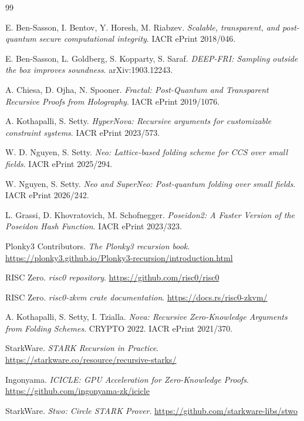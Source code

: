 \documentclass[11pt]{article}
\begin{document}
\begin{thebibliography}{99}

E. Ben-Sasson, I. Bentov, Y. Horesh, M. Riabzev.
\emph{Scalable, transparent, and post-quantum secure computational integrity}.
IACR ePrint 2018/046.

E. Ben-Sasson, L. Goldberg, S. Kopparty, S. Saraf.
\emph{DEEP-FRI: Sampling outside the box improves soundness}.
arXiv:1903.12243.

A. Chiesa, D. Ojha, N. Spooner.
\emph{Fractal: Post-Quantum and Transparent Recursive Proofs from Holography}.
IACR ePrint 2019/1076.

A. Kothapalli, S. Setty.
\emph{HyperNova: Recursive arguments for customizable constraint systems}.
IACR ePrint 2023/573.

W. D. Nguyen, S. Setty.
\emph{Neo: Lattice-based folding scheme for CCS over small fields}.
IACR ePrint 2025/294.

W. Nguyen, S. Setty.
\emph{Neo and SuperNeo: Post-quantum folding over small fields}.
IACR ePrint 2026/242.

L. Grassi, D. Khovratovich, M. Schofnegger.
\emph{Poseidon2: A Faster Version of the Poseidon Hash Function}.
IACR ePrint 2023/323.

Plonky3 Contributors.
\emph{The Plonky3 recursion book}.
\url{https://plonky3.github.io/Plonky3-recursion/introduction.html}

RISC Zero. \emph{risc0 repository}.
\url{https://github.com/risc0/risc0}

RISC Zero. \emph{risc0-zkvm crate documentation}.
\url{https://docs.rs/risc0-zkvm/}

A. Kothapalli, S. Setty, I. Tzialla.
\emph{Nova: Recursive Zero-Knowledge Arguments from Folding Schemes}.
CRYPTO 2022. IACR ePrint 2021/370.

StarkWare. \emph{STARK Recursion in Practice}.
\url{https://starkware.co/resource/recursive-starks/}

Ingonyama. \emph{ICICLE: GPU Acceleration for Zero-Knowledge Proofs}.
\url{https://github.com/ingonyama-zk/icicle}

StarkWare. \emph{Stwo: Circle STARK Prover}.
\url{https://github.com/starkware-libs/stwo}

\end{thebibliography}
\end{document}
